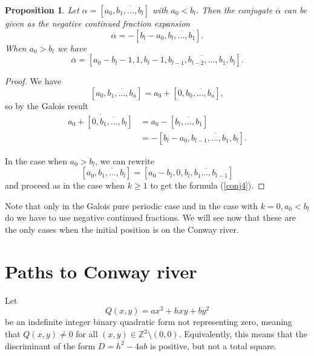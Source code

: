 \documentclass[11pt,reqno]{amsart}
\newtheorem{prop}{Proposition}
\begin{document}
\begin{prop} \label{thm:riverconj} Let $\alpha=[a_0, \overline{b_1,\dots, b_l}]$ with $a_0 < b_l$. Then the conjugate $\overline{\alpha}$ can be given as the negative continued fraction expansion
\begin{equation}
\label{conj3}
\overline{\alpha} = - \left[ b_l - a_0, \overline{b_l, \ldots, b_1} \right].
\end{equation}
When $a_0 > b_l$ we have 
\begin{equation}
\label{conj4}
\overline{\alpha}=[a_0-b_l-1,1,b_l-1, \overline{b_{l-1}, b_{l-2},\dots, b_1, b_l}].
\end{equation}
\end{prop}
\begin{proof}
We have
\begin{equation*}
\left[a_0, \overline{b_1, \ldots, b_n}\right] = a_0 + \left[ 0, \overline{b_0, \ldots, b_n}\right],
\end{equation*}
so by the Galois result
\begin{align*}
\overline{a_0 + \left[ 0, \overline{b_1, \ldots, b_l}\right]} &= a_0 - \left[\overline{b_l, \ldots, b_1} \right] \\
&= - \left[b_l - a_0, \overline{b_{l-1}, \ldots, b_1, b_l} \right].
\end{align*}


In the case when $a_0 > b_l$, we can rewrite 
\begin{equation*}
\left[a_0, \overline{b_1, \ldots, b_l} \right] = \left[a_0 - b_l, 0, \overline{b_l, b_1 \ldots, b_{l-1}} \right]
\end{equation*}
and proceed as in the case when $k\geq 1$ to get the formula (\ref{conj4}).
\end{proof}

Note that only in the Galois pure periodic case and in the case with $k=0, a_0 < b_l$ do we have to use negative continued fractions. We will see now that
these are the only cases when the initial position is on the Conway river.

\section{Paths to Conway river}

Let 
\begin{equation*}
Q(x, y) = ax^2 + hxy + by^2
\end{equation*}
be an indefinite integer binary quadratic form not representing zero, meaning that
$Q(x,y) \neq 0$ for all $(x,y)\in \mathbb Z^2\setminus (0,0).$ Equivalently, this means that the discriminant of the form
$
D=h^2-4ab
$
is positive, but not a total square.
\end{document}

